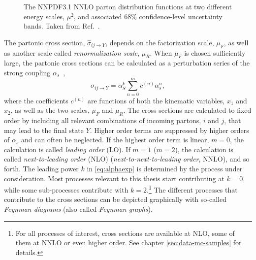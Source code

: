 \begin{figure}
  \caption[The NNPDF3.1 NNLO parton distribution functions at two different energy scales.]{The NNPDF3.1 NNLO parton distribution functions at two different energy scales, $\mu^2$, and associated 68\% confidence-level uncertainty bands. Taken from Ref.~\cite{2017NNPDF}.}
  \label{fig:pdfs}
\end{figure}

The partonic cross section, $\hat{\sigma}_{ij \rightarrow Y}$, depends on the factorization scale, $\mu_F$, as well as another scale called \emph{renormalization scale}, $\mu_R$.
When $\mu_F$ is chosen sufficiently large, the partonic cross sections can be calculated as a perturbation series of the strong coupling $\alpha_s$~\cite{Ellis:1991qj},
\begin{equation}
  \hat{\sigma}_{ij \rightarrow Y} = \alpha^k_S \sum_{n=0}^{m} c^{(n)}\alpha_s^n,
  \label{eq:alphaexp}
\end{equation}
where the coefficients $c^{(n)}$ are functions of both the kinematic variables, $x_1$ and $x_2$, as well as the two scales, $\mu_F$ and $\mu_R$. The cross sections are calculated to fixed order by including all relevant combinations of incoming partons, $i$ and $j$, that may lead to the final state $Y$. Higher order terms are suppressed by higher orders of $\alpha_s$ and can often be neglected.
If the highest order term is linear, $m=0$, the calculation is called \emph{leading order} (LO). If $m=1$ ($m=2$), the calculation is called \emph{next-to-leading order} (NLO) (\emph{next-to-next-to-leading order}, NNLO), and so forth. 
The leading power $k$ in \cref{eq:alphaexp} is determined by the process under consideration. Most processes relevant to this thesis start contributing at $k=0$, while some sub-processes contribute with $k=2$.\footnote{For all processes of interest, cross sections are available at NLO, some of them at NNLO or even higher order. See chapter \cref{sec:data-mc-samples} for details.}
The different processes that contribute to the cross sections can be depicted graphically with so-called \emph{Feynman diagrams} (also called \emph{Feynman graphs}). 

